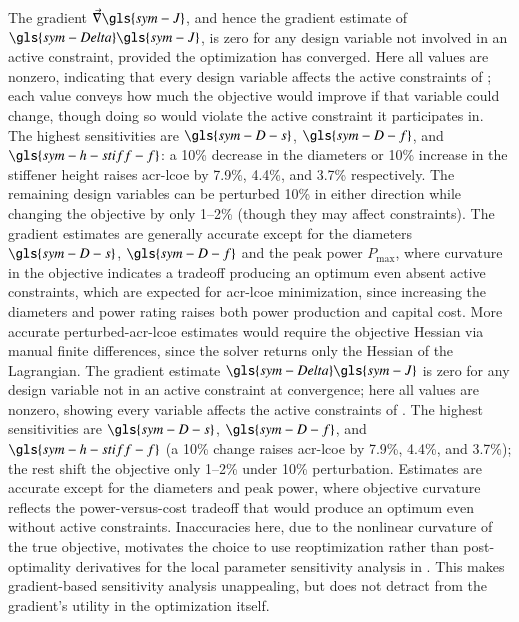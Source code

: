 \ifdefined\DISSERTATION
    The gradient $\vec{\nabla} \gls{sym-J}$, and hence the gradient estimate of $\gls{sym-Delta} \gls{sym-J}$, is zero for any design variable not involved in an active constraint, provided the optimization has converged.
    Here all values are nonzero, indicating that every design variable affects the active constraints of ; each value conveys how much the objective would improve if that variable could change, though doing so would violate the active constraint it participates in.
    The highest sensitivities are $\gls{sym-D-s}$, $\gls{sym-D-f}$, and $\gls{sym-h-stiff-f}$: a 10\% decrease in the diameters or 10\% increase in the stiffener height raises \gls{acr-lcoe} by 7.9\%, 4.4\%, and 3.7\% respectively.
    The remaining design variables can be perturbed 10\% in either direction while changing the objective by only 1--2\% (though they may affect constraints).
    The gradient estimates are generally accurate except for the diameters $\gls{sym-D-s}$, $\gls{sym-D-f}$ and the peak power $P_{\text{max}}$, where curvature in the objective indicates a tradeoff producing an optimum even absent active constraints, which are expected for \gls{acr-lcoe} minimization, since increasing the diameters and power rating raises both power production and capital cost.
    More accurate perturbed-\gls{acr-lcoe} estimates would require the objective Hessian via manual finite differences, since the solver returns only the Hessian of the Lagrangian.
\else
    The gradient estimate $\gls{sym-Delta} \gls{sym-J}$ is zero for any design variable not in an active constraint at convergence; here all values are nonzero, showing every variable affects the active constraints of .
    The highest sensitivities are $\gls{sym-D-s}$, $\gls{sym-D-f}$, and $\gls{sym-h-stiff-f}$ (a 10\% change raises \gls{acr-lcoe} by 7.9\%, 4.4\%, and 3.7\%); the rest shift the objective only 1--2\% under 10\% perturbation.
    Estimates are accurate except for the diameters and peak power, where objective curvature reflects the power-versus-cost tradeoff that would produce an optimum even without active constraints.
\fi
Inaccuracies here, due to the nonlinear curvature of the true objective,
motivates the choice to use reoptimization rather than post-optimality derivatives for the local parameter sensitivity analysis in .
This makes gradient-based sensitivity analysis unappealing, but does not detract from the gradient's utility in the optimization itself.

